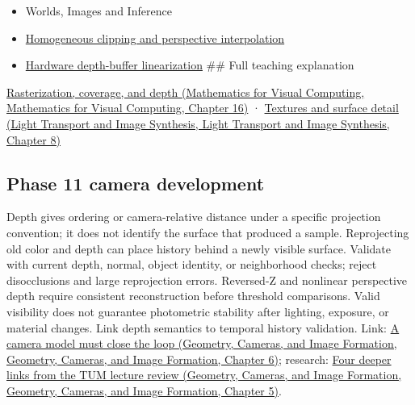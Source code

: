 \begin{itemize}
\item
  {Worlds, Images and Inference}
\item
  \hyperref[appendix-40426e4b2103]{Homogeneous clipping and perspective interpolation}
\item
  \hyperref[appendix-1bc40b08db4a]{Hardware depth-buffer linearization} \#\# Full teaching explanation
\end{itemize}

\href{../02-Mathematics-for-Visual-Computing/main.pdf\#nameddest=03-visual-computing-i-ch012-rasterization-coverage-and-depth}{Rasterization, coverage, and depth (Mathematics for Visual Computing, Mathematics for Visual Computing, Chapter 16)} · \href{../04-Light-Transport-and-Image-Synthesis/main.pdf\#nameddest=03-visual-computing-i-ch019-textures-and-surface-detail}{Textures and surface detail (Light Transport and Image Synthesis, Light Transport and Image Synthesis, Chapter 8)}

\subsection{Phase 11 camera development}\label{appendix-97578ed97952-phase-11-camera-development}

Depth gives ordering or camera-relative distance under a specific projection convention; it does not identify the surface that produced a sample. Reprojecting old color and depth can place history behind a newly visible surface. Validate with current depth, normal, object identity, or neighborhood checks; reject disocclusions and large reprojection errors. Reversed-Z and nonlinear perspective depth require consistent reconstruction before threshold comparisons. Valid visibility does not guarantee photometric stability after lighting, exposure, or material changes. Link depth semantics to temporal history validation. Link: \href{../03-Geometry-Cameras-and-Image-Formation/main.pdf\#nameddest=02-foundations-ii-ch037-a-camera-model-must-close-the-loop}{A camera model must close the loop (Geometry, Cameras, and Image Formation, Geometry, Cameras, and Image Formation, Chapter 6)}; research: \href{../03-Geometry-Cameras-and-Image-Formation/main.pdf\#nameddest=02-foundations-ii-ch036-four-deeper-links-from-the-tum-lecture-review}{Four deeper links from the TUM lecture review (Geometry, Cameras, and Image Formation, Geometry, Cameras, and Image Formation, Chapter 5)}.
